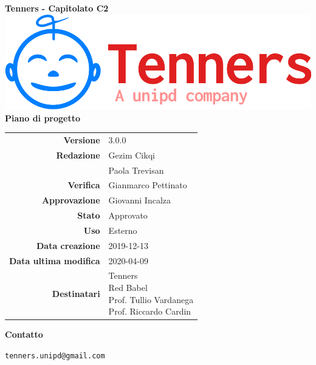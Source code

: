 \begin{titlepage}
	\begin{center}
		\large \textbf{Tenners - Capitolato C2}
		\vfill
		\includegraphics[scale = 0.3]{./res/img/logo.png}\\
		\vfill
		\Huge \textbf{Piano di progetto}

        \vfill
        \large

        \begin{tabular}{r|l}
                        \textbf{Versione} & 3.0.0 \\
                        \textbf{Redazione} &
                        Gezim Cikqi\\&
                        Paola Trevisan\\
                        \textbf{Verifica} &
                        Gianmarco Pettinato\\
                        \textbf{Approvazione} & Giovanni Incalza\\
                        \textbf{Stato} & Approvato \\
                        \textbf{Uso} &  Esterno\\
                        \textbf{Data creazione} &  2019-12-13\\
                        \textbf{Data ultima modifica} &  2020-04-09\\
                        \textbf{Destinatari} & \parbox[t]{5cm}{Tenners\\Red Babel\\Prof. Tullio Vardanega\\Prof. Riccardo Cardin}
                \end{tabular}
                \vfill
                \normalsize
                \vfill
                \textbf{Contatto}

                \texttt{tenners.unipd@gmail.com}

	\end{center}
\end{titlepage}
